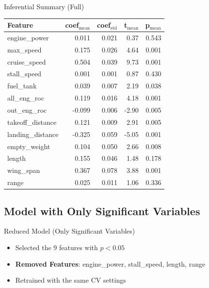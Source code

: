 \documentclass{beamer}
\begin{document}
\begin{frame}{Inferential Summary (Full)}
\begin{tabular}{@{}lrrrr@{}}
    \toprule
    Feature          & coef$_{\text{mean}}$ & coef$_{\text{std}}$ & t$_{\text{mean}}$ & p$_{\text{mean}}$ \\
    \midrule
    engine\_power     & 0.011 & 0.021 &  0.37 & 0.543  \\
    max\_speed        & 0.175 & 0.026 &  4.64 & 0.001 \\
    cruise\_speed     & 0.504 & 0.039 &  9.73 & 0.001 \\
    stall\_speed      & 0.001 & 0.001 &  0.87 & 0.430  \\
    fuel\_tank        & 0.039 & 0.007 &  2.19 & 0.038  \\
    all\_eng\_roc      & 0.119 & 0.016 &  4.18 & 0.001 \\
    out\_eng\_roc      &-0.099 & 0.006 & -2.90 & 0.005  \\
    takeoff\_distance & 0.121 & 0.009 &  2.91 & 0.005  \\
    landing\_distance &-0.325 & 0.059 & -5.05 & 0.001 \\
    empty\_weight     & 0.104 & 0.050 &  2.66 & 0.008  \\
    length           & 0.155 & 0.046 &  1.48 & 0.178  \\
    wing\_span        & 0.367 & 0.078 &  3.88 & 0.001 \\
    range            & 0.025 & 0.011 &  1.06 & 0.336  \\
    \bottomrule
\end{tabular}
\end{frame}

\subsection{Model with Only Significant Variables}
\begin{frame}{Reduced Model (Only Significant Variables)}
    \begin{itemize}
        \item Selected the 9 features with \(p < 0.05\)
        \item \textbf{Removed Features}: engine\_power, stall\_speed, length, range
        \item Retrained with the same CV settings
    \end{itemize}
\end{frame}
\end{document}
